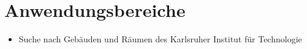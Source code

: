\section{Anwendungsbereiche}

\begin{itemize}
	\item Suche nach Gebäuden und Räumen des Karlsruher Institut für Technologie
\end{itemize}